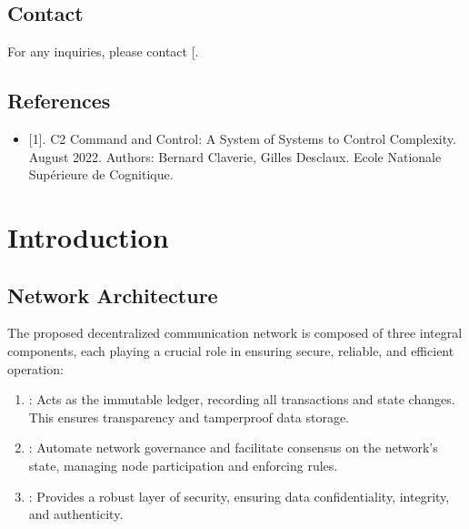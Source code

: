 \documentclass[a4paper,10pt,english]{sphinxmanual}
\begin{document}
\section{Contact}
\label{\detokenize{overview:contact}}
\sphinxAtStartPar
For any inquiries, please contact {[}\sphinxhref{mailto:info@sunair.com}{info@sunair.com}{]}.


\section{References}
\label{\detokenize{overview:references}}\begin{itemize}
\item {} 
\sphinxAtStartPar
{[}1{]}. C2 \sphinxhyphen{} Command and Control: A System of Systems to Control Complexity. August 2022. Authors: Bernard Claverie, Gilles Desclaux. Ecole Nationale Supérieure de Cognitique.

\end{itemize}

\sphinxstepscope


\chapter{Introduction}
\label{\detokenize{introduction:introduction}}\label{\detokenize{introduction::doc}}

\section{Network Architecture}
\label{\detokenize{introduction:network-architecture}}
\sphinxAtStartPar
The proposed decentralized communication network is composed of three integral components, each playing a crucial role in ensuring secure, reliable, and efficient operation:
\begin{enumerate}
%
\item {} 
\sphinxAtStartPar
{}: Acts as the immutable ledger, recording all transactions and state changes. This ensures transparency and tamper\sphinxhyphen{}proof data storage.

\item {} 
\sphinxAtStartPar
{}: Automate network governance and facilitate consensus on the network’s state, managing node participation and enforcing rules.

\item {} 
\sphinxAtStartPar
{}: Provides a robust layer of security, ensuring data confidentiality, integrity, and authenticity.

\end{enumerate}
\end{document}
